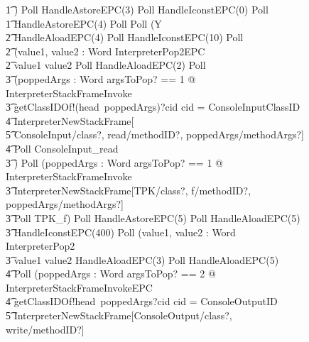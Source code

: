 \begin{figure}
{\begin{circus}
    \t1 \circfi) \circseq Poll \circseq HandleAstoreEPC(3) \circseq Poll \circseq HandleIconstEPC(0) \circseq Poll \circseq \\
    \t1 HandleAstoreEPC(4) \circseq Poll \circseq Poll \circseq (\circmu Y \circspot \\
    \t2 HandleAloadEPC(4) \circseq Poll \circseq HandleIconstEPC(10) \circseq Poll \circseq \\
    \t2 (\circvar value1, value2 : Word \circspot InterpreterPop2EPC \\
    \t2 \circif value1 \leq value2 \circthen Poll \circseq HandleAloadEPC(2) \circseq Poll \circseq \\
    \t3 (\circvar poppedArgs : \seq Word \circspot \lschexpract \exists argsToPop?  == 1 @ InterpreterStackFrameInvoke \rschexpract \circseq \\
    \t3 getClassIDOf!(head~poppedArgs)?cid \then \circif cid = ConsoleInputClassID \circthen {} \\
    \t4 \lschexpract InterpreterNewStackFrame[ \\
    \t5 ConsoleInput/class?, read/methodID?, poppedArgs/methodArgs?] \rschexpract \circseq \\
    \t4 Poll \circseq ConsoleInput\_read \\
    \t3 \circfi) \circseq Poll \circseq (\circvar poppedArgs : \seq Word \circspot \lschexpract \exists argsToPop? == 1 @ InterpreterStackFrameInvoke \rschexpract \circseq \\
    \t3 \lschexpract InterpreterNewStackFrame[TPK/class?, f/methodID?, poppedArgs/methodArgs?] \rschexpract \circseq \\
    \t3 Poll \circseq TPK\_f) \circseq Poll \circseq HandleAstoreEPC(5) \circseq Poll \circseq HandleAloadEPC(5) \circseq \\
    \t3 HandleIconstEPC(400) \circseq Poll \circseq (\circvar value1, value2 : Word \circspot InterpreterPop2 \circseq \\
    \t3 \circif value1 \leq value2 \circthen HandleAloadEPC(3) \circseq Poll \circseq HandleAloadEPC(5) \circseq \\
    \t4 Poll \circseq (\circvar poppedArgs : Word \circspot \lschexpract \exists argsToPop? == 2 @ InterpreterStackFrameInvokeEPC \rschexpract \circseq \\
    \t4 getClassIDOf!head~poppedArgs?cid \then \circif cid = ConsoleOutputID \circthen {} \\
    \t5 \lschexpract InterpreterNewStackFrame[ConsoleOutput/class?, write/methodID?] \rschexpract \circseq \\

\end{circus}}
\end{figure}
